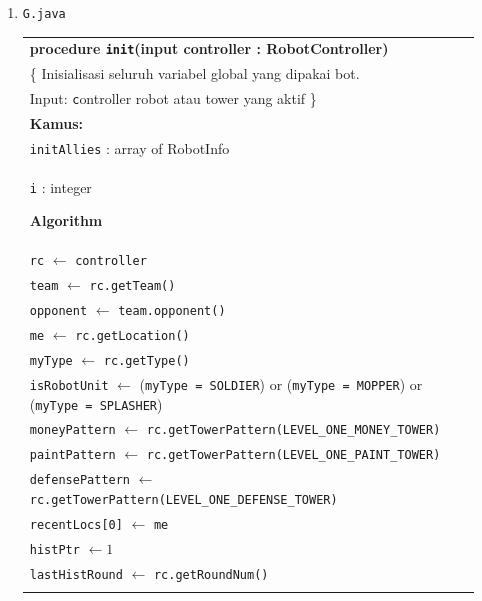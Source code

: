 \documentclass{article}
\newenvironment{pseudobox}
{
\centering
\begin{longtable}{|p{0.94\linewidth}|}
\hline
}
{
\\ \hline
\end{longtable}
\vspace{0.05cm}
}
\begin{document}
\begin{enumerate}[label=\alph*.]
\begin{enumerate}[label=\alph*.]
\item \texttt{G.java}

\begin{pseudobox}
\textbf{procedure \texttt{init}(input controller : RobotController)} \\
\{ Inisialisasi seluruh variabel global yang dipakai bot. \\
Input: \texttt controller robot atau tower yang aktif
\}\\

\textbf{Kamus:} \\
\hspace*{1.5em}\texttt{initAllies} : array of RobotInfo \\
\hspace*{1.5em}\texttt{i} : integer

\textbf{Algorithm} \\
\hspace*{1.5em}\texttt{rc} $\leftarrow$ \texttt{controller} \\
\hspace*{1.5em}\texttt{team} $\leftarrow$ \texttt{rc.getTeam()} \\
\hspace*{1.5em}\texttt{opponent} $\leftarrow$ \texttt{team.opponent()} \\
\hspace*{1.5em}\texttt{me} $\leftarrow$ \texttt{rc.getLocation()} \\
\hspace*{1.5em}\texttt{myType} $\leftarrow$ \texttt{rc.getType()} \\

\hspace*{1.5em}\texttt{isRobotUnit} $\leftarrow$ (\texttt{myType = SOLDIER}) or (\texttt{myType = MOPPER}) or (\texttt{myType = SPLASHER}) \\

\hspace*{1.5em}\texttt{moneyPattern} $\leftarrow$ \texttt{rc.getTowerPattern(LEVEL\_ONE\_MONEY\_TOWER)} \\
\hspace*{1.5em}\texttt{paintPattern} $\leftarrow$ \texttt{rc.getTowerPattern(LEVEL\_ONE\_PAINT\_TOWER)} \\
\hspace*{1.5em}\texttt{defensePattern} $\leftarrow$ \texttt{rc.getTowerPattern(LEVEL\_ONE\_DEFENSE\_TOWER)} \\

\hspace*{1.5em}\texttt{recentLocs[0]} $\leftarrow$ \texttt{me} \\
\hspace*{1.5em}\texttt{histPtr} $\leftarrow 1$ \\
\hspace*{1.5em}\texttt{lastHistRound} $\leftarrow$ \texttt{rc.getRoundNum()} \\


\end{pseudobox}
\end{enumerate}
\end{enumerate}
\end{document}
